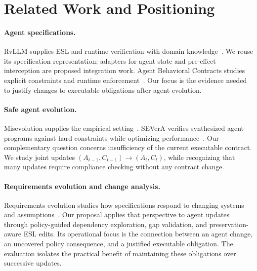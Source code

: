 \section{Related Work and Positioning}
\paragraph{Agent specifications.}
RvLLM supplies ESL and runtime verification with domain knowledge~\cite{zhang2025rvllm}. We reuse its specification representation; adapters for agent state and pre-effect interception are proposed integration work. Agent Behavioral Contracts studies explicit constraints and runtime enforcement~\cite{bhardwaj2026abc}. Our focus is the evidence needed to justify changes to executable obligations after agent evolution.

\paragraph{Safe agent evolution.}
Misevolution supplies the empirical setting~\cite{shao2025misevolve}. SEVerA verifies synthesized agent programs against hard constraints while optimizing performance~\cite{banerjee2026severa}. Our complementary question concerns insufficiency of the current executable contract. We study joint updates \((A_{t-1},C_{t-1})\rightarrow(A_t,C_t)\), while recognizing that many updates require compliance checking without any contract change.

\paragraph{Requirements evolution and change analysis.}
Requirements evolution studies how specifications respond to changing systems and assumptions~\cite{ali2011requirements}. Our proposal applies that perspective to agent updates through policy-guided dependency exploration, gap validation, and preservation-aware ESL edits. Its operational focus is the connection between an agent change, an uncovered policy consequence, and a justified executable obligation. The evaluation isolates the practical benefit of maintaining these obligations over successive updates.
